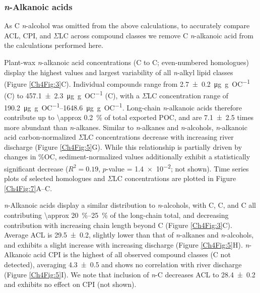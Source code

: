 \subsubsection{\textit{n}-Alkanoic acids}

As C \textit{n}-alcohol was omitted from the above calculations, to accurately compare ACL, CPI, and $\Sigma$LC across compound classes we remove C \textit{n}-alkanoic acid from the calculations performed here.

Plant-wax \textit{n}-alkanoic acid concentrations (C to C; even-numbered homologues) display the highest values and largest variability of all \textit{n}-alkyl lipid classes (Figure \ref{Ch4Fig:3}C). Individual compounds range from \SI{2.7 \pm 0.2}{\micro g.g.OC^{-1}} (C) to \SI{457.1 \pm 2.3}{\micro g.g.OC^{-1}} (C), with a $\Sigma$LC concentration range of \SIrange{190.2}{1648.6}{\micro g.g.OC^{-1}}. Long-chain \textit{n}-alkanoic acids therefore contribute up to \SI{\approx 0.2}{\%} of total exported POC, and are \num{7.1 \pm 2.5} times more abundant than \textit{n}-alkanes. Similar to \textit{n}-alkanes and \textit{n}-alcohols, \textit{n}-alkanoic acid carbon-normalized $\Sigma$LC concentrations decrease with increasing river discharge (Figure \ref{Ch4Fig:5}G). While this relationship is partially driven by changes in \%OC, sediment-normalized values additionally exhibit a statistically significant decrease ($R^2 = 0.19$, $p$-value = \num{1.4e-2}; not shown). Time series plots of selected homologues and $\Sigma$LC concentrations are plotted in Figure \ref{Ch4Fig:7}A--C.

\textit{n}-Alkanoic acids display a similar distribution to \textit{n}-alcohols, with C, C, and C all contributing \SIrange{\approx 20}{25}{\%} of the long-chain total, and decreasing contribution with increasing chain length beyond C (Figure \ref{Ch4Fig:3}C). Average ACL is \num{29.5 \pm 0.2}, slightly lower than that of \textit{n}-alkanes and \textit{n}-alcohols, and exhibits a slight increase with increasing discharge (Figure \ref{Ch4Fig:5}H). \textit{n}-Alkanoic acid CPI is the highest of all observed compound classes (C not detected), averaging \num{4.3 \pm 0.5} and shows no correlation with river discharge (Figure \ref{Ch4Fig:5}I). We note that inclusion of \textit{n}-C decreases ACL to \num{28.4 \pm 0.2} and exhibits no effect on CPI (not shown).

